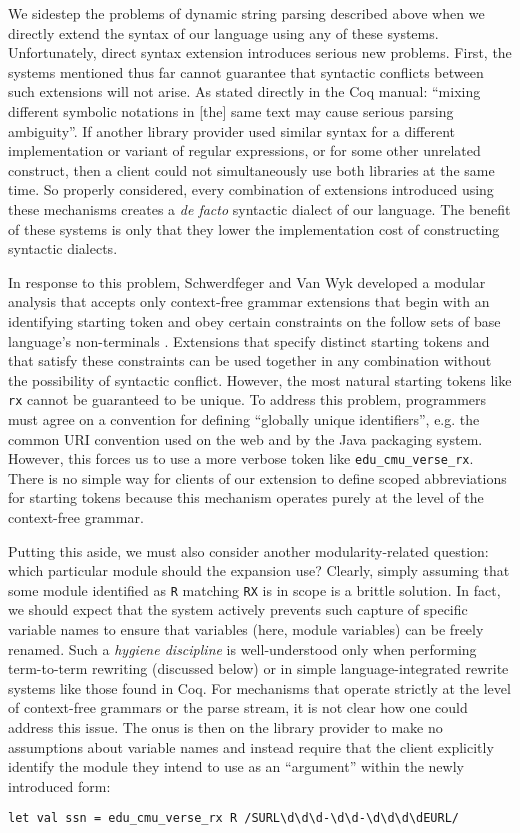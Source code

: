 We sidestep the problems of dynamic string parsing described above  when we directly extend the syntax of our language using any of these systems. Unfortunately, direct syntax extension introduces serious new problems. First, the systems mentioned thus far cannot guarantee that {syntactic conflicts} between such extensions will not arise. As stated directly in the  Coq manual: ``mixing different symbolic notations in [the] same text may cause serious parsing ambiguity''. If another library provider used similar syntax for a different implementation or variant of regular expressions, or for some other unrelated construct, then a client could not simultaneously use both libraries at the same time. So properly considered, every combination of extensions introduced using these mechanisms creates a \emph{de facto} syntactic dialect of our language. The benefit of these systems is only that they lower the implementation cost of constructing syntactic dialects. %

In response to this problem, Schwerdfeger and Van Wyk developed a modular analysis that accepts only context-free grammar extensions that begin with an identifying starting token and obey certain constraints on  the follow sets of base language's non-terminals \cite{conf/pldi/SchwerdfegerW09}. Extensions that specify distinct starting tokens and that satisfy these constraints can be used together in any combination without the possibility of syntactic conflict. However, the most natural starting tokens like \lstinline{rx} cannot be guaranteed to be unique. To address this problem, programmers must agree on a convention for defining ``globally unique identifiers'', e.g. the common URI convention used on the web and by the Java packaging system. However, this forces us to use a more verbose token like \lstinline{edu_cmu_verse_rx}. There is no simple way for clients of our extension to define scoped abbreviations for starting tokens because this mechanism operates purely at the level of the context-free grammar.

Putting this aside, we must also consider another modularity-related question: which particular module should the expansion use? Clearly, simply assuming that some module identified as \lstinline{R} matching \lstinline{RX} is in scope is a brittle solution. In fact, we should expect that the system actively prevents such capture of specific variable names to ensure that variables (here, module variables) can be freely renamed. Such a \emph{hygiene discipline} is well-understood only when performing term-to-term rewriting (discussed below) or in simple language-integrated rewrite systems like those found in Coq. For mechanisms that operate strictly at the level of context-free grammars or the parse stream, it is not clear how one could address this issue. The onus is then on the library provider to make no assumptions about variable names and instead require that the client explicitly identify the module they intend to use as an ``argument'' within the newly introduced form:
\begin{lstlisting}[numbers=none]
let val ssn = edu_cmu_verse_rx R /SURL\d\d\d-\d\d-\d\d\d\dEURL/
\end{lstlisting}

